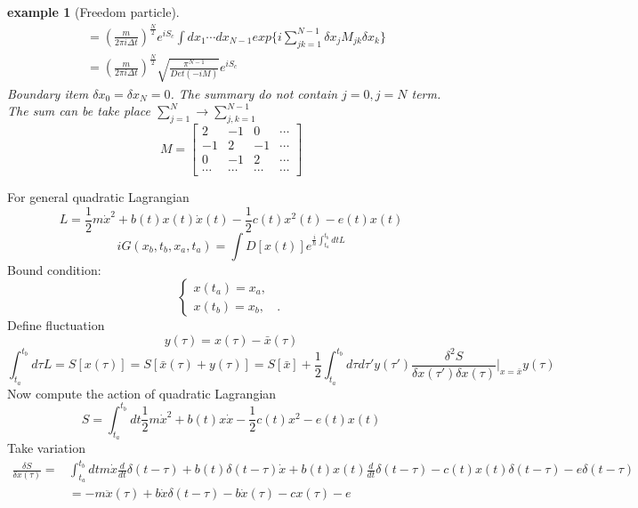 \documentclass[a4paper,11pt]{article}
\newtheorem{example}{example}[subsection]
\begin{document}
\begin{example}[Freedom particle]
\begin{equation*}
\begin{split}
         &=\left(\frac{m}{2\pi i\Delta t}\right)^{\frac{N}{2}}e^{iS_c}\int dx_1\cdots dx_{N-1}exp\{i\sum_{jk=1}^{N-1}\delta x_jM_{jk}\delta x_k\}\\
         &=\left(\frac{m}{2\pi i\Delta t}\right)^{\frac{N}{2}}\sqrt{\frac{\pi^{N-1}}{Det(-iM)}}e^{iS_c}
    \end{split}
  \end{equation*}
  Boundary item $\delta x_0=\delta x_N=0$. The summary do not contain $j=0,j=N$ term. The sum can be take place $\sum_{j=1}^{N}\to\sum_{j,k=1}^{N-1}$
  \begin{equation*}
    M=\begin{bmatrix}
        2 & -1 & 0 & \cdots \\
        -1 & 2 & -1 & \cdots \\
        0 & -1 & 2 & \cdots \\
        \cdots & \cdots & \cdots & \cdots
      \end{bmatrix}
  \end{equation*}
\end{example}
For general quadratic Lagrangian
\begin{equation*}
  L=\frac{1}{2}m\dot{x}^2+b(t)x(t)\dot{x}(t)-\frac{1}{2}c(t)x^2(t)-e(t)x(t)
\end{equation*}
\begin{equation*}
  iG(x_b,t_b,x_a,t_a)=\int D[x(t)]e^{\frac{i}{\hbar}\int_{t_a}^{t_b}dt L}
\end{equation*}
Bound condition:
\begin{equation*}
  \begin{cases}
  x(t_a)=x_a,&\\
  x(t_b)=x_b,&.
  \end{cases}
\end{equation*}
Define fluctuation
\begin{equation*}
  y(\tau)=x(\tau)-\bar{x}(\tau)
\end{equation*}
\begin{equation*}
  \int_{t_a}^{t_b}d\tau L=S[x(\tau)]=S[\bar{x}(\tau)+y(\tau)]=S[\bar{x}]+\frac{1}{2}\int_{t_a}^{t_b}d\tau d\tau'y(\tau')\frac{\delta^2S}{\delta x(\tau')\delta x(\tau)}|_{x=\bar{x}}y(\tau)
\end{equation*}
Now compute the action of quadratic Lagrangian
\begin{equation*}
  S=\int_{t_a}^{t_b}dt\frac{1}{2}m\dot{x}^2+b(t)x\dot{x}-\frac{1}{2}c(t)x^2-e(t)x(t)
\end{equation*}
Take variation
\begin{equation*}
  \begin{split}
     \frac{\delta S}{\delta x(\tau)}=&\int_{t_a}^{t_b}dtm\dot{x}\frac{d}{dt}\delta(t-\tau)+b(t)\delta(t-\tau)\dot{x}+b(t)x(t)\frac{d}{dt}\delta(t-\tau)-c(t)x(t)\delta(t-\tau)-e\delta(t-\tau)\\
       &=-m\ddot{x}(\tau)+b\dot{x}\delta(t-\tau)-b\dot{x}(\tau)-cx(\tau)-e
  \end{split}
\end{equation*}
\end{document}
